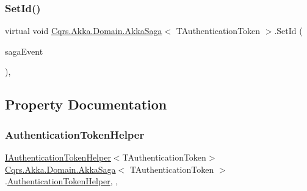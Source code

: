 \subsubsection{\texorpdfstring{Set\+Id()}{SetId()}}
{\footnotesize\ttfamily virtual void \hyperlink{classCqrs_1_1Akka_1_1Domain_1_1AkkaSaga}{Cqrs.\+Akka.\+Domain.\+Akka\+Saga}$<$ T\+Authentication\+Token $>$.Set\+Id (\begin{DoxyParamCaption}\item[{\hyperlink{interfaceCqrs_1_1Events_1_1ISagaEvent}{I\+Saga\+Event}$<$ T\+Authentication\+Token $>$}]{saga\+Event }\end{DoxyParamCaption})\hspace{0.3cm}{\ttfamily [protected]}, {\ttfamily [virtual]}}



\subsection{Property Documentation}
\mbox{\label{classCqrs_1_1Akka_1_1Domain_1_1AkkaSaga_a18e4d7faa9cd9d10ac2ac0bd3b6c9fc9_a18e4d7faa9cd9d10ac2ac0bd3b6c9fc9}} 
\subsubsection{\texorpdfstring{Authentication\+Token\+Helper}{AuthenticationTokenHelper}}
{\footnotesize\ttfamily \hyperlink{interfaceCqrs_1_1Authentication_1_1IAuthenticationTokenHelper}{I\+Authentication\+Token\+Helper}$<$T\+Authentication\+Token$>$ \hyperlink{classCqrs_1_1Akka_1_1Domain_1_1AkkaSaga}{Cqrs.\+Akka.\+Domain.\+Akka\+Saga}$<$ T\+Authentication\+Token $>$.\hyperlink{classCqrs_1_1Authentication_1_1AuthenticationTokenHelper}{Authentication\+Token\+Helper}\hspace{0.3cm}{\ttfamily [get]}, {\ttfamily [set]}, {\ttfamily [protected]}}

\mbox{\label{classCqrs_1_1Akka_1_1Domain_1_1AkkaSaga_ac00968d1d69d89d46b43af10fc0d4510_ac00968d1d69d89d46b43af10fc0d4510}} 
